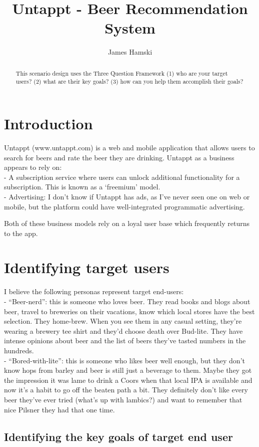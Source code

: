 \documentclass[journal=jacsat,manuscript=article]{achemso}
\author{James Hamski}
\title[]{Untappt - Beer Recommendation System}
\begin{document}
\begin{abstract}
This scenario design uses the Three Question Framework (1) who are your
target users? (2) what are their key goals? (3) how can you help them
accomplish their goals?
\end{abstract}
\section{Introduction}\label{introduction}

Untappt (www.untappt.com) is a web and mobile application that allows
users to search for beers and rate the beer they are drinking. Untappt
as a business appears to rely on:\\
- A subscription service where users can unlock additional functionality
for a subscription. This is known as a `freemium' model.\\
- Advertising: I don't know if Untappt has ads, as I've never seen one
on web or mobile, but the platform could have well-integrated
programmatic advertising.

Both of these business models rely on a loyal user base which frequently
returns to the app.

\section{Identifying target users}\label{identifying-target-users}

I believe the following personas represent target end-users:\\
- ``Beer-nerd'': this is someone who loves beer. They read books and
blogs about beer, travel to breweries on their vacations, know which
local stores have the best selection. They home-brew. When you see them
in any casual setting, they're wearing a brewery tee shirt and they'd
choose death over Bud-lite. They have intense opinions about beer and
the list of beers they've tasted numbers in the hundreds.\\
- ``Bored-with-lite'': this is someone who likes beer well enough, but
they don't know hops from barley and beer is still just a beverage to
them. Maybe they got the impression it was lame to drink a Coors when
that local IPA is available and now it's a habit to go off the beaten
path a bit. They definitely don't like every beer they've ever tried
(what's up with lambics?) and want to remember that nice Pilsner they
had that one time.

\subsection{Identifying the key goals of target end
user}\label{identifying-the-key-goals-of-target-end-user}
\end{document}

